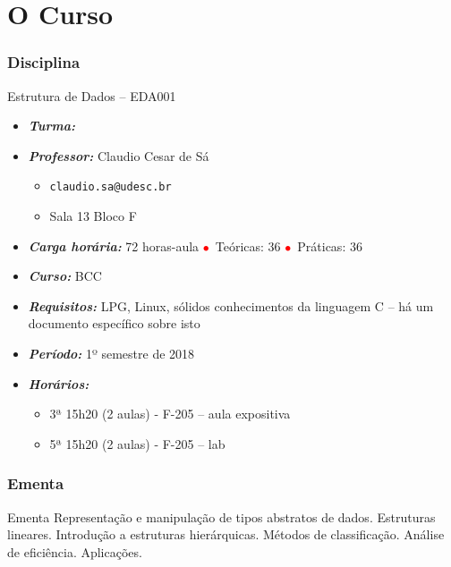 
\section{O Curso}
\begin{frame}


\frametitle{Disciplina}

\begin{block}{Estrutura de Dados -- EDA001}

\begin{itemize}
\item \emph{\textbf{Turma:}} 
\item \emph{\textbf{Professor:}} Claudio Cesar de Sá
  \begin{itemize}
  \item \texttt{claudio.sa@udesc.br}
  \item Sala 13 Bloco F
  \end{itemize}
\item \emph{\textbf{Carga horária:}} 72 horas-aula 
\textcolor{red}{$\bullet$}~Teóricas: 36 \textcolor{red}{$\bullet$}~Práticas: 36
\item \emph{\textbf{Curso:}} BCC
\item \emph{\textbf{Requisitos:}} LPG, Linux, sólidos conhecimentos da linguagem C -- há um documento específico sobre isto
\item \emph{\textbf{Período:}} 1º semestre de 2018
\item \emph{\textbf{Horários:}}
  \begin{itemize}
  \item 3ª 15h20 (2 aulas) - F-205  -- aula expositiva
  \item 5ª 15h20 (2 aulas) - F-205 -- lab
  
  \end{itemize}

\end{itemize}

\end{block}

\end{frame}


\begin{frame}
\frametitle{Ementa}

\begin{block}{Ementa}
Representação e manipulação de tipos abstratos de dados. Estruturas lineares. 
Introdução a estruturas hierárquicas. Métodos de classificação. Análise de eficiência. Aplicações.
\end{block}

\end{frame}

